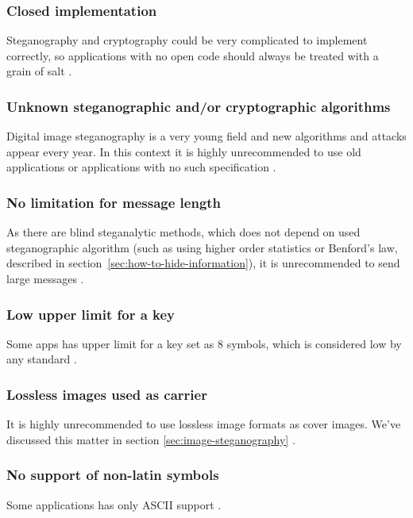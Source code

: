 \subsubsection{Closed implementation}
Steganography and cryptography could be very complicated to implement correctly, so applications with
no open code should always be treated with a grain of salt
\cite{app0, app1, app2, app3, app4, app5, app7, app8,app9,app10,app11,app12,app13,app14,app15,app16,app17,app18}
.

\subsubsection{Unknown steganographic and/or cryptographic algorithms}
Digital image steganography is a very young field and new algorithms and attacks appear every year.
In this context it is highly unrecommended to use old applications or applications with no such 
specification
\cite{app0, app1, app2, app3, app4, app5, app7,app8,app9,app10,app11,app12,app13,app14,app15,app16,app17,app18}
.

\subsubsection{No limitation for message length}
As there are blind steganalytic methods, which does not depend on used steganographic algorithm 
(such as using higher order statistics or Benford's law, described in section~\ref{sec:how-to-hide-information}),
it is unrecommended to send large messages
\cite{app0, app1, app2, app3, app4, app5, app7,app8,app9,app10,app11,app12,app13,app14,app15,app16,app17,app18}
.

\subsubsection{Low upper limit for a key}
Some apps has upper limit for a key set as $8$ symbols, which is considered low
by any standard
\cite{app0}
.

\subsubsection{Lossless images used as carrier}
It is highly unrecommended to use lossless image formats as cover images. 
We've discussed this matter in section \ref{sec:image-steganography}
\cite{app2, app3}
.

\subsubsection{No support of non-latin symbols}
Some applications has only ASCII support
\cite{app3, app17}
.

